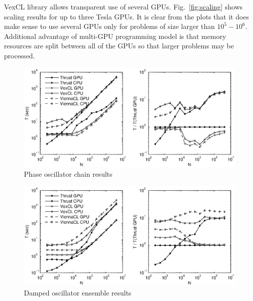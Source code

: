 \documentclass[1p]{elsarticle}
\newcommand{\figref}[1]{Fig.~\ref{#1}}
\begin{document}
VexCL library allows transparent use of several GPUs. \figref{fig:scaling}
shows scaling results for up to three Tesla GPUs. It is clear from the plots
that it does make sense to use several GPUs only for problems of size larger
than $10^5-10^6$. Additional advantage of multi-GPU programming model is that
memory resources are split between all of the GPUs so that larger problems may
be processed.

\begin{figure}[p]
    \begin{center}
        \includegraphics[width=\textwidth]{data/phase_oscillator_chain/perfcmp}
    \end{center}
    \caption{Phase oscillator chain results}
    \label{fig:phase:perf}
\end{figure}

\begin{figure}[p]
    \begin{center}
        \includegraphics[width=\textwidth]{data/damped_oscillator/perfcmp}
    \end{center}
    \caption{Damped oscillator ensemble results}
    \label{fig:damped:perf}
\end{figure}
\end{document}

